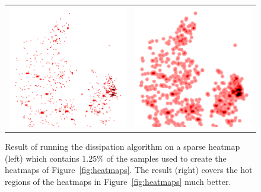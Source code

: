 \documentclass[11pt, oneside]{report}
\begin{document}
{\begin{figure}
\centering
\begin{tabular}{ll}
\includegraphics[scale=0.5]{figs-tileheat/heat_d-before.png} & \includegraphics[scale=0.5]{figs-tileheat/heat_d-after.png} \\
\end{tabular}
\caption{Result of running the dissipation algorithm on a sparse heatmap (left) which contains $1.25\%$ of the samples used to create the heatmaps of Figure~\ref{fig:heatmaps}. The result (right) covers the hot regions of the heatmaps in Figure~\ref{fig:heatmaps} much better.}
\label{fig:dissipate_before_after}
\end{figure}

}
\end{document}
